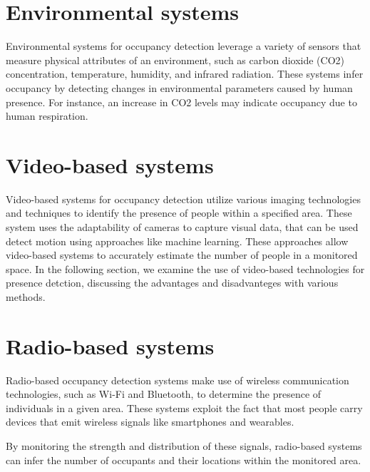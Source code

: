 \section{Environmental systems}\label{sec:presence_env}
Environmental systems for occupancy detection leverage a variety of sensors that measure physical attributes of an environment, such as carbon dioxide (CO2) concentration, temperature, humidity, and infrared radiation.
These systems infer occupancy by detecting changes in environmental parameters caused by human presence.
For instance, an increase in CO2 levels may indicate occupancy due to human respiration.\cite{longoAccurateOccupancyEstimation2019}
% 

\section{Video-based systems}\label{sec:presence_video}
Video-based systems for occupancy detection utilize various imaging technologies and techniques to identify the presence of people within a specified area. 
These system uses the adaptability of cameras to capture visual data, that can be used detect motion using approaches like machine learning. 
These approaches allow video-based systems to accurately estimate the number of people in a monitored space.
In the following section, we examine the use of video-based technologies for presence detction, discussing the advantages and disadvanteges with various methods.


\section{Radio-based systems}\label{sec:presence_radio}
Radio-based occupancy detection systems make use of wireless communication technologies, such as Wi-Fi and Bluetooth, to determine the presence of individuals in a given area.
These systems exploit the fact that most people carry devices that emit wireless signals like smartphones and wearables.

By monitoring the strength and distribution of these signals, radio-based systems can infer the number of occupants and their locations within the monitored area.\cite{longoAccurateOccupancyEstimation2019, teissedre-2019}
